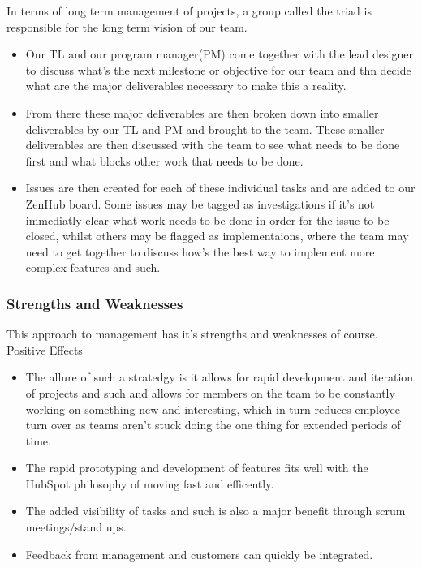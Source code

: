 \documentclass[11pt]{article} %
\begin{document}
In terms of long term management of projects, a group called the triad is responsible for the long term vision of our team.
 \begin{itemize}  
 \item Our TL and our program manager(PM) come together with the lead designer to discuss what's the next milestone or objective for our team and thn decide what are the major deliverables necessary to make this a reality. 
 \item From there these major deliverables are then broken down into smaller deliverables by our TL and PM and brought to the team. These smaller deliverables are then discussed with the team to see what needs to be done first and what blocks other work that needs to be done. 
 \item Issues are then created for each of these individual tasks and are added to our ZenHub board. Some issues may be tagged as investigations if it's not immediatly clear what work needs to be done in order for the issue to be closed, whilst others may be flagged as implementaions, where the team may need to get together to discuss how's the best way to implement more complex features and such.
\\ \end{itemize}
\subsubsection{\textbf {Strengths and Weaknesses}}
This approach to management has it's strengths and weaknesses of course.
\\
Positive Effects \begin{itemize} 
\item The allure of such a stratedgy is it allows for rapid development and iteration of projects and such and allows for members on the team to be constantly working on something new and interesting, which in turn reduces employee turn over as teams aren't stuck doing the one thing for extended periods of time. 
\item The rapid prototyping and development of features fits well with the HubSpot philosophy of moving fast and efficently. 
\item The added visibility of tasks and such is also a major benefit through scrum meetings/stand ups. 
\item Feedback from management and customers can quickly be integrated.
\end{itemize}  
\end{document}
